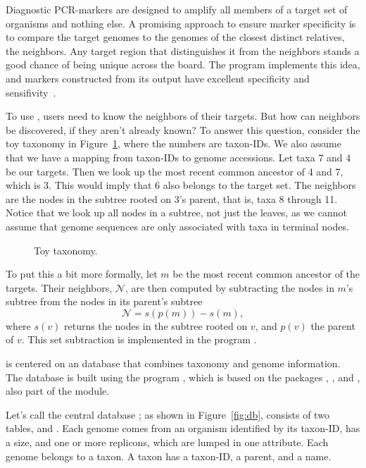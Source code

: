 Diagnostic PCR-markers are designed to amplify all members of a target
set of organisms and nothing else. A promising approach to ensure
marker specificity is to compare the target genomes to the genomes of
the closest distinct relatives, the neighbors. Any target region that
distinguishes it from the neighbors stands a good chance of being
unique across the board. The program  implements this idea,
and markers constructed from its output have excellent specificity and
sensifivity~\cite{hau21:fur}.

To use , users need to know the neighbors of their
targets. But how can neighbors be discovered, if they aren't already
known? To answer this question, consider the toy taxonomy in
Figure~\ref{fig:tax}, where the numbers are taxon-IDs. We also assume
that we have a mapping from taxon-IDs to genome accessions. Let taxa 7
and 4 be our targets. Then we look up the most recent common ancestor
of 4 and 7, which is 3. This would imply that 6 also belongs to the
target set. The neighbors are the nodes in the subtree rooted on 3's
parent, that is, taxa 8 through 11. Notice that we look up all nodes
in a subtree, not just the leaves, as we cannot assume that genome
sequences are only associated with taxa in terminal nodes.

\begin{figure}
\begin{center}

\end{center}
\caption{Toy taxonomy.}\label{fig:tax}
\end{figure}

To put this a bit more formally, let $m$ be the most recent common
ancestor of the targets. Their neighbors, $\mathcal{N}$, are then
computed by subtracting the nodes in $m$'s subtree from the nodes in
its parent's subtree
\begin{equation}\label{eq:nei}
\mathcal{N} = s(p(m)) - s(m),
\end{equation}
where $s(v)$ returns the nodes in the subtree rooted on $v$, and
$p(v)$ the parent of $v$. This set subtraction is implemented in the
program .

 is centered on an 
database that combines taxonomy and genome information. The database
is built using the program , which is based on the
packages , , and , also part of the module.

Let's call the central database ; as shown in
Figure~\ref{fig:db},  consists of two
tables,  and . Each genome comes from an organism
identified by its taxon-ID, has a size, and one or more replicons,
which are lumped in one attribute. Each genome belongs to a taxon. A
taxon has a taxon-ID, a parent, and a name.

